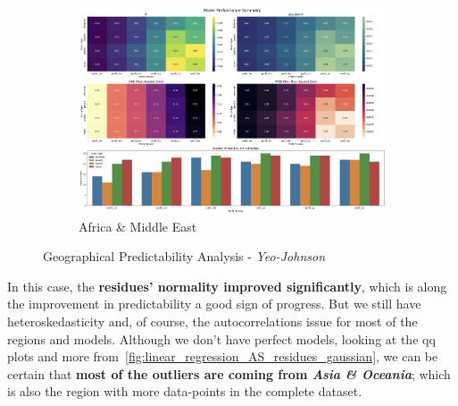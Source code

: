 \documentclass[11pt,english,a4paper,hidelinks]{book}
\begin{document}
\begin{figure}[H]
    \begin{subfigure}[b]{0.48\textwidth}
        \centering
        \includegraphics[width=\textwidth]{images/code/models/linear_regression/second_model/AF - performance.png}
        \caption{Africa \& Middle East}
    \end{subfigure}
    \caption{Geographical Predictability Analysis - \textit{Yeo-Johnson}}
    \label{fig:region_performance_first_model_gaussian}
\end{figure}

\noindent In this case, the \textbf{residues' normality improved significantly}, which is along the improvement in predictability a good sign of progress. But we still have heteroskedasticity and, of course, the autocorrelations issue for most of the regions and models. Although we don't have perfect models, looking at the \acrshort{qq} plots and more from~\ref{fig:linear_regression_AS_residues_gaussian}, we can be certain that \textbf{most of the outliers are coming from \textit{Asia \& Oceania}}; which is also the region with more data-points in the complete dataset.
\end{document}
